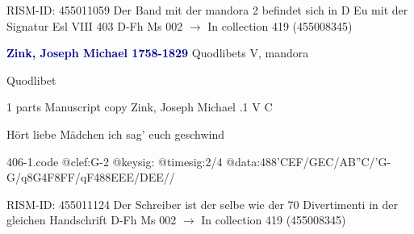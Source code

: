 \documentclass[twocolumn]{book}
\begin{document}
\newline RISM-ID: 455011059
\newline Der Band mit der mandora 2 befindet sich in D Eu mit der Signatur Esl VIII 403
\newline D-Fh  Ms 002
\newline $\rightarrow$ In collection 419 (455008345)

\newline \par \vspace{7pt} \textcolor{darkblue}{\textbf{Zink, Joseph Michael  1758-1829}}
\newline Quodlibets    
\newline V, mandora
\newline \begin{itshape}[heading, f.48v:] Quodlibet\end{itshape} 
\newline \textcolor{darkblue}{}  1 parts  
\newline Manuscript copy
\newline Zink, Joseph Michael
.1  V  C
\newline \begin{footnotesize} Hört liebe Mädchen ich sag' euch geschwind \end{footnotesize}  
\begin{filecontents*}{406-1.code}
@clef:G-2
@keysig:
@timesig:2/4
@data:488'CEF/GEC/AB''C/'G-G/q8G4F8FF/qF488EEE/DEE//
\end{filecontents*}
\newline
%

\newline RISM-ID: 455011124
\newline Der Schreiber ist der selbe wie der 70 Divertimenti in der gleichen Handschrift
\newline D-Fh  Ms 002
\newline $\rightarrow$ In collection 419 (455008345)
\end{document}

